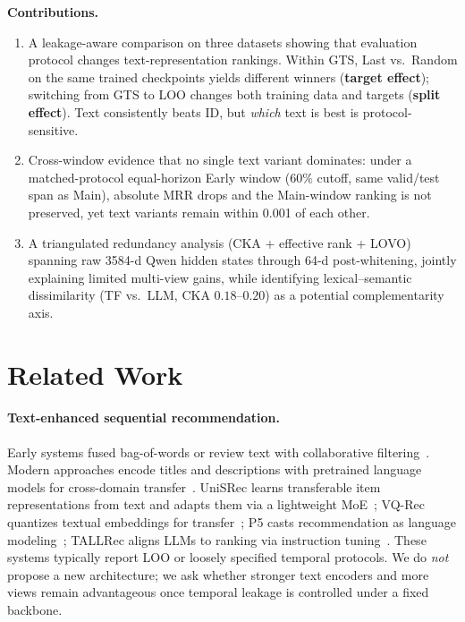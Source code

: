\documentclass[sigconf,natbib=true,anonymous]{acmart}
\begin{document}
\noindent\textbf{Contributions.}
\nopagebreak
\begin{enumerate}[leftmargin=*,itemsep=1pt,topsep=4pt]
\item A leakage-aware comparison on three datasets showing that evaluation protocol changes text-representation rankings.  Within GTS, Last vs.\ Random on the same trained checkpoints yields different winners (\textbf{target effect}); switching from GTS to LOO changes both training data and targets (\textbf{split effect}).  Text consistently beats ID, but \emph{which} text is best is protocol-\hspace{0pt}sensitive.
\item Cross-window evidence that no single text variant dominates: under a matched-protocol equal-horizon Early window ($60\%$ cutoff, same valid/\hspace{0pt}test span as Main), absolute MRR drops and the Main-window ranking is not preserved, yet text variants remain within 0.001 of each other.
\item A triangulated redundancy analysis (CKA + effective rank + LOVO) spanning raw 3584-d Qwen hidden states through 64-d post-whitening, jointly explaining limited multi-view gains, while identifying lexical--semantic dissimilarity (TF vs.\ LLM, CKA $0.18$--$0.20$) as a potential complementarity axis.
\end{enumerate}

\section{Related Work}
\label{sec:related}

\paragraph{Text-enhanced sequential recommendation.}
Early systems fused bag-of-words or review text with collaborative filtering~\cite{wang2015cdl,salton1988termweighting}.
Modern approaches encode titles and descriptions with pretrained language models for cross-domain transfer~\cite{hou2022unisrec,hou2023vqrec,geng2022p5,bao2023tallrec}.
UniSRec learns transferable item representations from text and adapts them via a lightweight MoE~\cite{hou2022unisrec}; VQ-Rec quantizes textual embeddings for transfer~\cite{hou2023vqrec}; P5 casts recommendation as language modeling~\cite{geng2022p5}; TALLRec aligns LLMs to ranking via instruction tuning~\cite{bao2023tallrec}.
These systems typically report LOO or loosely specified temporal protocols.
We do \emph{not} propose a new architecture; we ask whether stronger text encoders and more views remain advantageous once temporal leakage is controlled under a fixed backbone.
\end{document}
